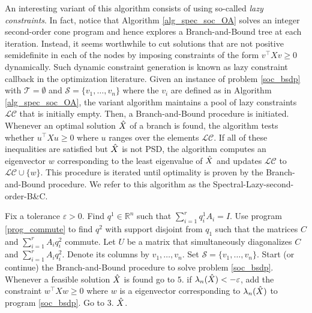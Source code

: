 \documentclass{article}
\begin{document}
An interesting variant of this algorithm consists of using so-called \emph{lazy constraints}. In fact, notice that Algorithm \ref{alg_spec_soc_OA} solves an integer second-order cone program and hence explores a Branch-and-Bound tree at each iteration. Instead, it seems worthwhile to cut solutions that are not positive semidefinite in each of the nodes by imposing constraints of the form $v^\top X v \geq 0$ dynamically. Such dynamic constraint generation is known as lazy constraint callback in the optimization literature.
Given an instance of problem \eqref{soc_bsdp} with $\mathcal{T}= \emptyset$ and $\mathcal{S} = \{v_1,\dots,v_n\}$ where the $v_i$ are defined as in Algorithm \ref{alg_spec_soc_OA}, the variant algorithm maintains a pool of lazy constraints $\mathcal{LC}$ that is initially empty. Then, a Branch-and-Bound procedure is initiated. Whenever an optimal solution $\Hat{X}$ of a branch is found, the algorithm tests whether $u^\top X u \geq 0$ where $u$ ranges over the elements $\mathcal{LC}$. If all of these inequalities are satisfied but $\Hat{X}$ is not PSD, the algorithm computes an eigenvector $w$ corresponding to the least eigenvalue of $\Hat{X}$ and updates $\mathcal{LC}$ to $ \mathcal{LC}\cup \{w\} $. This procedure is iterated until optimality is proven by the Branch-and-Bound procedure. We refer to this algorithm as the Spectral-Lazy-second-order-B\&C.


\begin{algorithm}
\caption{Spectral-Lazy-second-order-B\&C}
\label{alg_lazy_soc}
\begin{algorithmic}[1]

\State Fix a tolerance $\varepsilon>0$. Find $q^1 \in \mathbb{R}^n$ such that $\sum_{i=1}^r q^1_iA_i = I$.  
\State Use program \eqref{prog_commute} to find $q^2$ with support disjoint from $q_1$ such that the matrices $C$ and $\sum_{i=1}^r A_iq_i^2$ commute. Let $U$ be a matrix that simultaneously diagonalizes $C$ and $\sum_{i=1}^r A_iq_i^2$. Denote its columns by $v_1,\dots, v_n$. Set $\mathcal{S} = \{ v_1,\dots, v_n \}$. 
\State Start (or continue) the Branch-and-Bound procedure to solve problem \eqref{soc_bsdp}. 
\State Whenever a feasible solution $\Hat{X}$ is found go to $5$. 
\State if $\lambda_n(\Hat{X})<-\varepsilon$, add the constraint $w^\top Xw \geq 0$ where $w$ is a eigenvector corresponding to $\lambda_n(\Hat{X})$ to program  \eqref{soc_bsdp}.
\State Go to $3$.
\Return $\Hat{X}$.
\end{algorithmic}
\end{algorithm}
\end{document}

